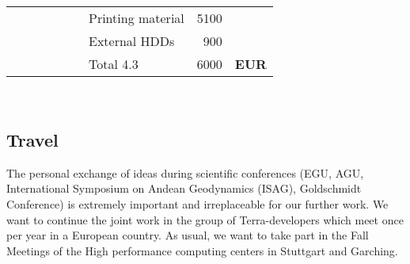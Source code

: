 \documentclass[twoside,10pt]{article}
\begin{document}
\noindent
\begin{tabular*}{\textwidth}{l@{\extracolsep\fill}llllllrr}
&&&&&& Printing material  & 5100 &\\ \cline{8-9}
&&&&&& External HDDs & 900 &\\ \cline{8-9}
&&&&&& Total 4.3 & 6000 & \textbf{EUR}\\ \cline{8-9}\cline{8-9}
\end{tabular*}\\

\subsection{Travel}
The personal exchange of ideas during scientific conferences (EGU, AGU, International Symposium on Andean Geodynamics (ISAG), Goldschmidt Conference) is extremely important and irreplaceable for our further work. 
We want to continue the joint work in the group of Terra-developers
which meet once per year in a European country.
As usual, we want to take part in the Fall Meetings of the High performance computing centers in Stuttgart and Garching.\\
\end{document}
